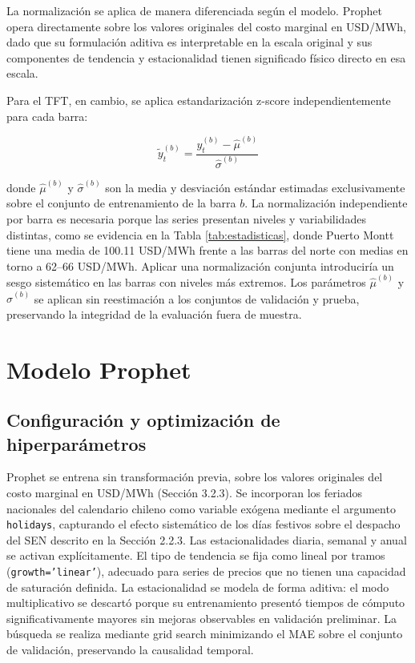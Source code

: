 La normalización se aplica de manera diferenciada según el modelo. Prophet opera directamente sobre los valores originales del costo marginal en USD/MWh, dado que su formulación aditiva es interpretable en la escala original y sus componentes de tendencia y estacionalidad tienen significado físico directo en esa escala.

Para el TFT, en cambio, se aplica estandarización z-score independientemente para cada barra:

\begin{equation}
    \tilde{y}_t^{(b)} = \frac{y_t^{(b)} - \hat{\mu}^{(b)}}{\hat{\sigma}^{(b)}}
\end{equation}

donde $\hat{\mu}^{(b)}$ y $\hat{\sigma}^{(b)}$ son la media y desviación estándar estimadas exclusivamente sobre el conjunto de entrenamiento de la barra $b$. La normalización independiente por barra es necesaria porque las series presentan niveles y variabilidades distintas, como se evidencia en la Tabla \ref{tab:estadisticas}, donde Puerto Montt tiene una media de 100.11 USD/MWh frente a las barras del norte con medias en torno a 62--66 USD/MWh. Aplicar una normalización conjunta introduciría un sesgo sistemático en las barras con niveles más extremos. Los parámetros $\hat{\mu}^{(b)}$ y $\hat{\sigma}^{(b)}$ se aplican sin reestimación a los conjuntos de validación y prueba, preservando la integridad de la evaluación fuera de muestra.

\section{Modelo Prophet}

\subsection{Configuración y optimización de hiperparámetros}

Prophet se entrena sin transformación previa, sobre los valores originales del costo marginal en USD/MWh (Sección 3.2.3). Se incorporan los feriados nacionales del calendario chileno como variable exógena mediante el argumento \texttt{holidays}, capturando el efecto sistemático de los días festivos sobre el despacho del SEN descrito en la Sección 2.2.3. Las estacionalidades diaria, semanal y anual se activan explícitamente. El tipo de tendencia se fija como lineal por tramos (\texttt{growth='linear'}), adecuado para series de precios que no tienen una capacidad de saturación definida. La estacionalidad se modela de forma aditiva: el modo multiplicativo se descartó porque su entrenamiento presentó tiempos de cómputo significativamente mayores sin mejoras observables en validación preliminar. La búsqueda se realiza mediante grid search minimizando el MAE sobre el conjunto de validación, preservando la causalidad temporal.

